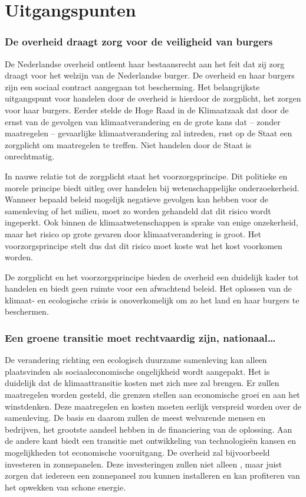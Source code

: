\chapter{Uitgangspunten}

\subsection{De overheid draagt zorg voor de veiligheid van burgers}

De Nederlandse overheid ontleent haar bestaansrecht aan het feit dat zij zorg draagt voor het welzijn van de Nederlandse burger. De overheid en haar burgers zijn een sociaal contract aangegaan tot bescherming. Het belangrijkste uitgangspunt voor handelen door de overheid is hierdoor de zorgplicht, het zorgen voor haar burgers. Eerder stelde de Hoge Raad in de Klimaatzaak dat door de ernst van de gevolgen van klimaatverandering en de grote kans dat – zonder maatregelen – gevaarlijke klimaatverandering zal intreden, rust op de Staat een zorgplicht om maatregelen te treffen. Niet handelen door de Staat is onrechtmatig.

In nauwe relatie tot de zorgplicht staat het voorzorgsprincipe. Dit politieke en morele principe biedt uitleg over handelen bij wetenschappelijke onderzoekerheid. Wanneer bepaald beleid mogelijk negatieve gevolgen kan hebben voor de samenleving of het milieu, moet zo worden gehandeld dat dit risico wordt ingeperkt. Ook binnen de klimaatwetenschappen is sprake van enige onzekerheid, maar het risico op grote gevaren door klimaatverandering is groot. Het voorzorgsprincipe stelt dus dat dit risico moet koste wat het kost voorkomen worden.

De zorgplicht en het voorzorgsprincipe bieden de overheid een duidelijk kader tot handelen en biedt geen ruimte voor een afwachtend beleid. Het oplossen van de klimaat- en ecologische crisis is onoverkomelijk om zo het land en haar burgers te beschermen.

\subsection{Een groene transitie moet rechtvaardig zijn, nationaal…}

De verandering richting een ecologisch duurzame samenleving kan alleen plaatsvinden als sociaaleconomische ongelijkheid wordt aangepakt. Het is duidelijk dat de klimaattransitie kosten met zich mee zal brengen. Er zullen maatregelen worden gesteld, die grenzen stellen aan economische groei en aan het winstdenken. Deze maatregelen en kosten moeten eerlijk verspreid worden over de samenleving. De basis en daarom zullen de meest welvarende mensen en bedrijven, het grootste aandeel hebben in de financiering van de oplossing. Aan de andere kant biedt een transitie met ontwikkeling van technologieën kansen en mogelijkheden tot economische vooruitgang. De overheid zal bijvoorbeeld investeren in zonnepanelen. Deze investeringen zullen niet alleen , maar juist zorgen dat iedereen een zonnepaneel zou kunnen installeren en kan profiteren van het opwekken van schone energie. 

